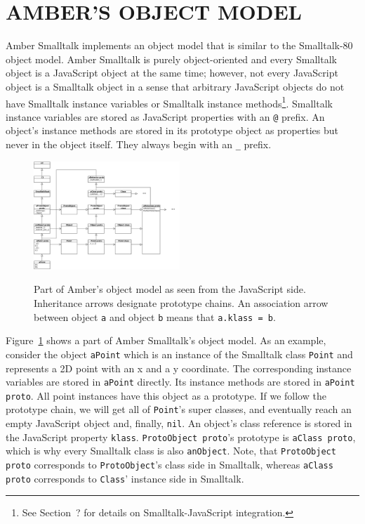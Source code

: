 \documentclass{sig-alternate}
\begin{document}
\section{AMBER'S OBJECT MODEL}
Amber Smalltalk implements an object model that is similar to the Smalltalk-80 object model. Amber Smalltalk is purely object-oriented and every Smalltalk object is a JavaScript object at the same time; however, not every JavaScript object is a Smalltalk object in a sense that arbitrary JavaScript objects do not have Smalltalk instance variables or Smalltalk instance methods\footnote{See Section~? for details on Smalltalk-JavaScript integration.}. Smalltalk instance variables are stored as JavaScript properties with an \texttt{@} prefix. An object's instance methods are stored in its prototype object as properties but never in the object itself. They always begin with an \texttt{\_} prefix.

\begin{figure}[h]
\centering
\includegraphics[width=0.49\textwidth]{amber_class_model.pdf}
\label{fig:amber_obj}
\caption{Part of Amber's object model as seen from the JavaScript side. Inheritance arrows designate prototype chains. An association arrow between object \texttt{a} and object \texttt{b} means that \texttt{a.klass = b}.}
\end{figure}

Figure~\ref{fig:amber_obj} shows a part of Amber Smalltalk's object model. As an example, consider the object \texttt{aPoint} which is an instance of the Smalltalk class \texttt{Point} and represents a 2D point with an x and a y coordinate. The corresponding instance variables are stored in \texttt{aPoint} directly. Its instance methods are stored in \texttt{aPoint proto}. All point instances have this object as a prototype. If we follow the prototype chain, we will get all of  \texttt{Point}'s super classes, and eventually reach an empty JavaScript object and, finally, \texttt{nil}. An object's class reference is stored in the JavaScript property \texttt{klass}. \texttt{ProtoObject proto}'s prototype is \texttt{aClass proto}, which is why every Smalltalk class is also \texttt{anObject}. Note, that \texttt{ProtoObject proto} corresponds to \texttt{ProtoObject}'s class side in Smalltalk, whereas \texttt{aClass proto} corresponds to \texttt{Class}' instance side in Smalltalk.
\end{document}
